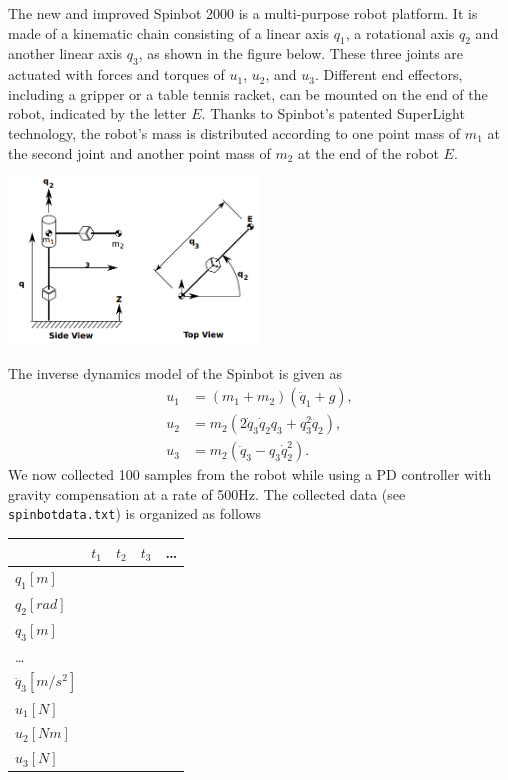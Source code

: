The new and improved Spinbot 2000 is a multi-purpose robot platform.
It is made of a kinematic chain consisting of a linear axis $q_{1}$, a rotational axis $q_{2}$ and another linear axis $q_{3}$, as shown in the figure below.
These three joints are actuated with forces and torques of $u_{1}$, $u_{2}$, and $u_{3}$.
Different end effectors, including a gripper or a table tennis racket, can be mounted on the end of the robot, indicated by the letter $E$.
Thanks to Spinbot's patented SuperLight technology, the robot's mass is distributed according to one point mass of $m_{1}$ at the second joint and another point mass of $m_{2}$ at the end of the robot $E$.

\includegraphics[width=0.5\textwidth]{img/spinbot.png}

The inverse dynamics model of the Spinbot is given as
\begin{align*}
u_{1} &= (m_{1}+m_{2})(\ddot{q}_{1}+g),\\
u_{2} &= m_{2}(2\dot{q}_{3}\dot{q}_{2}q_{3}+q_{3}^{2}\ddot{q}_{2}),\\
u_{3} &= m_{2}(\ddot{q}_{3}-q_{3}\dot{q}_{2}^{2}).
\end{align*}
We now collected 100 samples from the robot while using a PD controller with gravity compensation at a rate of 500Hz.
The collected data (see \texttt{spinbotdata.txt}) is organized as follows\\
\begin{tabular}{| l || c | c | c | l  }
  \hline
   & $t_1$ & $t_2$ & $t_3$ & \ldots\\
  \hline
  \hline
  $q_{1}[m]$ &  &  &  & \\
  \hline
  $q_{2}[rad]$ &  &  &  & \\
  \hline
  $q_{3}[m]$ &  &  &  & \\
  \hline
  \ldots &  &  &  &  \\
  \hline
  $\ddot{q}_{3}[m/s^{2}]$ &  &  &  & \\
  \hline
  $u_{1}[N]$ &  &  &  & \\
  \hline
  $u_{2}[Nm]$ &  &  &  & \\
  \hline
  $u_{3}[N]$ &  &  &  & \\
  \hline
\end{tabular}


